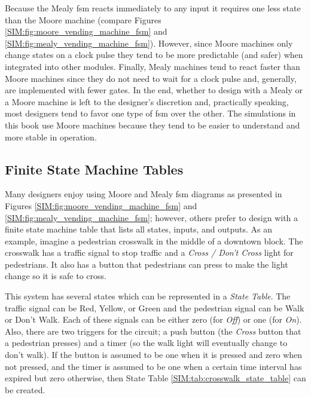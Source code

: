 Because the Mealy \gls{fsm} reacts immediately to any input it requires one less state than the Moore machine (compare Figures \ref{SIM:fig:moore_vending_machine_fsm} and \ref{SIM:fig:mealy_vending_machine_fsm}). However, since Moore machines only change states on a clock pulse they tend to be more predictable (and safer) when integrated into other modules. Finally, Mealy machines tend to react faster than Moore machines since they do not need to wait for a clock pulse and, generally, are implemented with fewer gates. In the end, whether to design with a Mealy or a Moore machine is left to the designer's discretion and, practically speaking, most designers tend to favor one type of \gls{fsm} over the other. The simulations in this book use Moore machines because they tend to be easier to understand and more stable in operation.

\subsection{Finite State Machine Tables}
\label{SIM:subsec:finite_state_machine_tables}

Many designers enjoy using Moore and Mealy \gls{fsm} diagrams as presented in Figures \ref{SIM:fig:moore_vending_machine_fsm} and \ref{SIM:fig:mealy_vending_machine_fsm}; however, others prefer to design with a finite state machine table that lists all states, inputs, and outputs. As an example, imagine a pedestrian crosswalk in the middle of a downtown block. The crosswalk has a traffic signal to stop traffic and a \emph{Cross / Don't Cross} light for pedestrians. It also has a button that pedestrians can press to make the light change so it is safe to cross.

This system has several states which can be represented in a \emph{State Table}. The traffic signal can be Red, Yellow, or Green and the pedestrian signal can be Walk or Don't Walk. Each of these signals can be either zero (for \emph{Off}) or one (for \emph{On}). Also, there are two triggers for the circuit; a push button (the \emph{Cross} button that a pedestrian presses) and a timer (so the walk light will eventually change to don't walk). If the button is assumed to be one when it is pressed and zero when not pressed, and the timer is assumed to be one when a certain time interval has expired but zero otherwise, then State Table \ref{SIM:tab:crosswalk_state_table} can be created.

